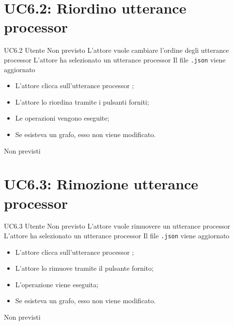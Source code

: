 \documentclass[../AnalisideiRequisiti.tex]{subfiles}
\begin{document}
\section{UC6.2: Riordino utterance processor}
\UserCase
{UC6.2}
{Utente}
{Non previsto}
{L'attore vuole cambiare l'ordine degli utterance processor}
{L'attore ha selezionato un utterance processor }
{Il file \verb|.json| viene aggiornato}
{
	\begin{itemize}
		\item{} L'attore clicca sull'utterance processor ;
		\item{} L'attore lo riordina tramite i pulsanti forniti;
		\item{} Le operazioni vengono eseguite;
		\item{} Se esisteva un grafo, esso non viene modificato.
		
	\end{itemize}
}
{Non previsti}

\section{UC6.3: Rimozione utterance processor}
\UserCase
{UC6.3}
{Utente}
{Non previsto}
{L'attore vuole rimuovere un utterance processor}
{L'attore ha selezionato un utterance processor }
{Il file \verb|.json| viene aggiornato}
{
	\begin{itemize}
		\item{} L'attore clicca sull'utterance processor ;
		\item{} L'attore lo rimuove tramite il pulsante fornito;
		\item{} L'operazione viene eseguita;
		\item{} Se esisteva un grafo, esso non viene modificato.
		
	\end{itemize}
}
{Non previsti}
\end{document}

